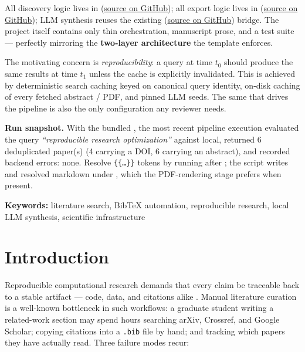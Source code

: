 \documentclass[
]{article}
\newcounter{none} %
\begin{document}
All discovery logic lives in 
(\href{https://github.com/docxology/template/tree/main/infrastructure/search/literature}{source
on GitHub}); all export logic lives in
(\href{https://github.com/docxology/template/tree/main/infrastructure/reference/citation}{source
on GitHub}); LLM synthesis reuses the existing
(\href{https://github.com/docxology/template/tree/main/infrastructure/llm}{source
on GitHub}) bridge. The project itself contains only thin orchestration,
manuscript prose, and a test suite --- perfectly mirroring the
\textbf{two-layer architecture} the template enforces.

The motivating concern is \emph{reproducibility}: a query at time
\(t_0\) should produce the same results at time \(t_1\) unless the cache
is explicitly invalidated. This is achieved by deterministic search
caching keyed on canonical query identity, on-disk caching of every
fetched abstract / PDF, and pinned LLM seeds. The same
 that drives the pipeline is also the
only configuration any reviewer needs.

\textbf{Run snapshot.} With the bundled ,
the most recent pipeline execution evaluated the query
\emph{``reproducible research optimization''} against local, returned 6
deduplicated paper(s) (4 carrying a DOI, 6 carrying an abstract), and
recorded backend errors: none. Resolve \texttt{\{\{…\}\}} tokens by
running  after
; the script writes
 and resolved markdown
under , which the PDF-rendering stage prefers
when present.

\textbf{Keywords:} literature search, BibTeX automation, reproducible
research, local LLM synthesis, scientific infrastructure

\newpage

\section{Introduction}\label{sec:introduction}

Reproducible computational research demands that every claim be
traceable back to a stable artifact --- code, data, and citations alike
\citep{peng2011reproducible}. Manual literature curation is a well-known
bottleneck in such workflows: a graduate student writing a related-work
section may spend hours searching arXiv, Crossref, and Google Scholar;
copying citations into a \texttt{.bib} file by hand; and tracking which
papers they have actually read. Three failure modes recur:
\end{document}
